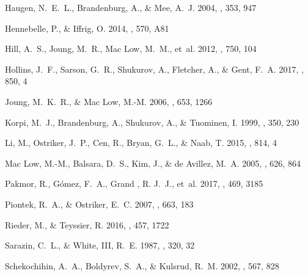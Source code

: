 \documentclass[preprint2]{aastex63}
\begin{document}
\begin{thebibliography}{}
{Haugen}, N.~E.~L., {Brandenburg}, A., \& {Mee}, A.~J. 2004{},
 \mnras, 353, 947

{Hennebelle}, P., \& {Iffrig}, O. 2014, \aap, 570, A81

{Hill}, A.~S., {Joung}, M.~R., {Mac Low}, M.~M., {et~al.} 2012, \apj, 750, 104

{Hollins}, J.~F., {Sarson}, G.~R., {Shukurov}, A., {Fletcher}, A., \& {Gent},
 F.~A. 2017, \apj, 850, 4

{Joung}, M.~K.~R., \& {Mac Low}, M.-M. 2006, \apj, 653, 1266

{Korpi}, M.~J., {Brandenburg}, A., {Shukurov}, A., \& {Tuominen}, I. 1999,
 \aap, 350, 230

{Li}, M., {Ostriker}, J.~P., {Cen}, R., {Bryan}, G.~L., \& {Naab}, T. 2015,
 \apj, 814, 4

{Mac Low}, M.-M., {Balsara}, D.~S., {Kim}, J., \& {de Avillez}, M.~A. 2005,
 \apj, 626, 864

{Pakmor}, R., {G{\'o}mez}, F.~A., {Grand }, R. J.~J., {et~al.} 2017, \mnras,
 469, 3185

{Piontek}, R.~A., \& {Ostriker}, E.~C. 2007, \apj, 663, 183

{Rieder}, M., \& {Teyssier}, R. 2016, \mnras, 457, 1722

{Sarazin}, C.~L., \& {White}, III, R.~E. 1987, \apj, 320, 32

{Schekochihin}, A.~A., {Boldyrev}, S.~A., \& {Kulsrud}, R.~M. 2002, \apj, 567,
 828


\end{thebibliography}
\end{document}
